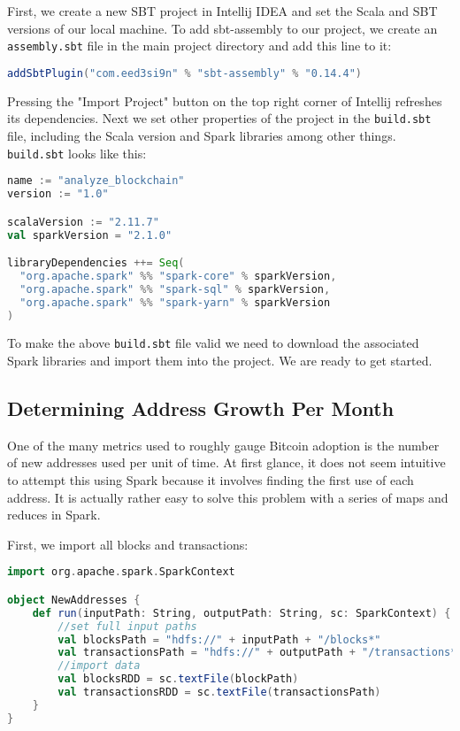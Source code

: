 \documentclass[9pt,twocolumn,twoside]{idsi}
\begin{document}
First, we create a new SBT project in Intellij IDEA and set the Scala and SBT versions of our local machine. To add sbt-assembly to our project, we create an \lstinline{assembly.sbt} file in the main project directory and add this line to it:

\begin{lstlisting}[language=Scala]
addSbtPlugin("com.eed3si9n" % "sbt-assembly" % "0.14.4")
\end{lstlisting}

Pressing the "Import Project" button on the top right corner of Intellij refreshes its dependencies. Next we set other properties of the project in the \lstinline{build.sbt} file, including the Scala version and Spark libraries among other things. \lstinline{build.sbt} looks like this:

\begin{lstlisting}[language=Scala]
name := "analyze_blockchain"
version := "1.0"

scalaVersion := "2.11.7"
val sparkVersion = "2.1.0"

libraryDependencies ++= Seq(
  "org.apache.spark" %% "spark-core" % sparkVersion,
  "org.apache.spark" %% "spark-sql" % sparkVersion,
  "org.apache.spark" %% "spark-yarn" % sparkVersion
)
\end{lstlisting}

To make the above \lstinline{build.sbt} file valid we need to download the associated Spark libraries and import them into the project. We are ready to get started.

\subsection{Determining Address Growth Per Month}
One of the many metrics used to roughly gauge Bitcoin adoption is the number of new addresses used per unit of time. At first glance, it does not seem intuitive to attempt this using Spark because it involves finding the first use of each address. It is actually rather easy to solve this problem with a series of maps and reduces in Spark.

First, we import all blocks and transactions:

\begin{lstlisting}[language=Scala]
import org.apache.spark.SparkContext

object NewAddresses {
    def run(inputPath: String, outputPath: String, sc: SparkContext) {
        //set full input paths
        val blocksPath = "hdfs://" + inputPath + "/blocks*"
        val transactionsPath = "hdfs://" + outputPath + "/transactions*"
        //import data
        val blocksRDD = sc.textFile(blockPath)
        val transactionsRDD = sc.textFile(transactionsPath)
    }
}
\end{lstlisting}
\end{document}
